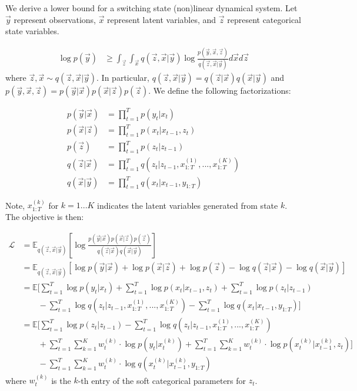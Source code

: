 \documentclass[12pt]{article}
\begin{document}
We derive a lower bound for a switching state (non)linear dynamical system. Let $\vec{y}$ represent observations, $\vec{x}$ represent latent variables, and $\vec{z}$ represent categorical state variables.

\begin{align}
    \log p(\vec{y}) &\geq \int_{\vec{z}} \int_{\vec{x}} q(\vec{z},\vec{x}|\vec{y}) \log \frac{p(\vec{y},\vec{x},\vec{z})}{q(\vec{z},\vec{x}|\vec{y})} d\vec{x} d\vec{z}
\end{align}
where $\vec{z},\vec{x} \sim q(\vec{z},\vec{x}|\vec{y})$. In particular, $q(\vec{z},\vec{x}|\vec{y}) = q(\vec{z}|\vec{x})q(\vec{x}|\vec{y})$ and $p(\vec{y},\vec{x},\vec{z}) = p(\vec{y}|\vec{x})p(\vec{x}|\vec{z})p(\vec{z})$. We define the following factorizations:

\begin{align}
    p(\vec{y}|\vec{x}) &= \prod_{t=1}^T p(y_t|x_t) \\
    p(\vec{x}|\vec{z}) &= \prod_{t=1}^T p(x_t|x_{t-1},z_t) \\
    p(\vec{z}) &= \prod_{t=1}^T p(z_t|z_{t-1}) \\
    q(\vec{z}|\vec{x}) &= \prod_{t=1}^T q(z_t|z_{t-1},x^{(1)}_{1:T},...,x^{(K)}_{1:T}) \\
    q(\vec{x}|\vec{y}) &= \prod_{t=1}^T q(x_t|x_{t-1},y_{1:T})
\end{align}

Note, $x^{(k)}_{1:T}$ for $k=1...K$ indicates the latent variables generated from state $k$. The objective is then:

\begin{align}
    \mathcal{L} &= \mathbb{E}_{q(\vec{z},\vec{x}|\vec{y})}[\log \frac{p(\vec{y}|\vec{x})p(\vec{x}|\vec{z})p(\vec{z})}{q(\vec{z}|\vec{x})q(\vec{x}|\vec{y})}] \\
    &= \mathbb{E}_{q(\vec{z},\vec{x}|\vec{y})}[\log p(\vec{y}|\vec{x}) + \log p(\vec{x}|\vec{z}) + \log p(\vec{z}) - \log q(\vec{z}|\vec{x}) - \log q(\vec{x}|\vec{y})] \\
    &= \mathbb{E}[\sum_{t=1}^T \log p(y_t|x_t) + \sum_{t=1}^T \log p(x_t|x_{t-1},z_t) + \sum_{t=1}^T \log p(z_t|z_{t-1}) \\ &\qquad - \sum_{t=1}^T \log q(z_t|z_{t-1},x^{(1)}_{1:T},...,x^{(K)}_{1:T}) -  \sum_{t=1}^T \log q(x_t|x_{t-1},y_{1:T})] \\
    &= \mathbb{E}[\sum_{t=1}^T \log p(z_t|z_{t-1}) - \sum_{t=1}^T \log q(z_t|z_{t-1},x^{(1)}_{1:T},...,x^{(K)}_{1:T}) \\
    &\qquad+ \sum_{t=1}^T \sum_{k=1}^K w_t^{(k)} \cdot \log p(y_t|x^{(k)}_t) + \sum_{t=1}^T \sum_{k=1}^K w_t^{(k)} \cdot \log p(x^{(k)}_t|x^{(k)}_{t-1},z_t)] \\
    &\qquad - \sum_{t=1}^T\sum_{k=1}^K w_t^{(k)} \cdot \log q(x^{(k)}_t|x^{(k)}_{t-1},y_{1:T})
\end{align}
where $w_t^{(k)}$ is the $k$-th entry of the soft categorical parameters for $z_t$.
\end{document}
